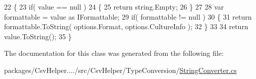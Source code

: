 \begin{DoxyCode}
22         \{
23             \textcolor{keywordflow}{if}( value == null )
24             \{
25                 \textcolor{keywordflow}{return} string.Empty;
26             \}
27 
28             var formattable = value as IFormattable;
29             \textcolor{keywordflow}{if}( formattable != null )
30             \{
31                 \textcolor{keywordflow}{return} formattable.ToString( options.Format, options.CultureInfo );
32             \}
33 
34             \textcolor{keywordflow}{return} value.ToString();
35         \}
\end{DoxyCode}


The documentation for this class was generated from the following file\-:\begin{DoxyCompactItemize}
\item 
packages/\-Csv\-Helper..../src/\-Csv\-Helper/\-Type\-Conversion/\hyperlink{a00243}{String\-Converter.\-cs}\end{DoxyCompactItemize}
